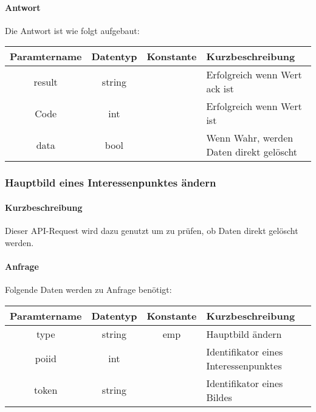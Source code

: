 \paragraph{Antwort}Die Antwort ist wie folgt aufgebaut:
\begin{table}[H]
	\begin{tabular}{|c|c|c|p{6.5cm}|}
		\hline
		\textbf{Paramtername} & \textbf{Datentyp} & \textbf{Konstante} & \textbf{Kurzbeschreibung}                                                                                               \\ \hline
		result              & string           &                 & Erfolgreich wenn Wert {\glqq ack\grqq} ist \\ \hline
		Code                & int              &                 & Erfolgreich wenn Wert {\glqq 0\grqq} ist \\ \hline
		data                & bool             &                 & Wenn Wahr, werden Daten direkt gelöscht \\ \hline
	\end{tabular}
\end{table}
\subsubsection{Hauptbild eines Interessenpunktes ändern}
\paragraph{Kurzbeschreibung}Dieser API-Request wird dazu genutzt um zu prüfen, ob Daten direkt gelöscht werden.
\paragraph{Anfrage}Folgende Daten werden zu Anfrage benötigt:
\begin{table}[H]
	\begin{tabular}{|c|c|c|p{6.5cm}|}
		\hline
		\textbf{Paramtername} & \textbf{Datentyp} & \textbf{Konstante} & \textbf{Kurzbeschreibung}                                                                                               \\ \hline
		type                & string            & emp                & Hauptbild ändern \\ \hline
		poiid				& int				& 					 & Identifikator eines Interessenpunktes \\ \hline
		token				& string			&					 & Identifikator eines Bildes \\ \hline
	\end{tabular}
\end{table}
